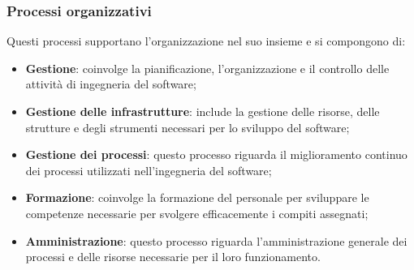 \subsubsection{Processi organizzativi}
Questi processi supportano l'organizzazione nel suo insieme e si compongono di:
\begin{itemize}
    \item \textbf{Gestione}: coinvolge la pianificazione, l'organizzazione e il controllo delle attività di ingegneria del software;
    \item \textbf{Gestione delle infrastrutture}: include la gestione delle risorse, delle strutture e degli strumenti necessari per lo sviluppo del software;
    \item \textbf{Gestione dei processi}: questo processo riguarda il miglioramento continuo dei processi utilizzati nell'ingegneria del software;
    \item \textbf{Formazione}: coinvolge la formazione del personale per sviluppare le competenze necessarie per svolgere efficacemente i compiti assegnati;
    \item \textbf{Amministrazione}: questo processo riguarda l'amministrazione generale dei processi e delle risorse necessarie per il loro funzionamento.
\end{itemize}
